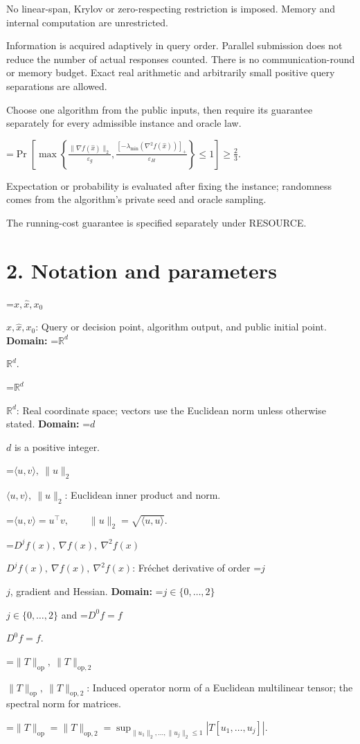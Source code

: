 \documentclass[10pt,a4paper]{article}
\newcommand{\AtlasMath}[1]{\par\begingroup\centering\setbox0=\hbox{$\displaystyle #1$}\ifdim\wd0>1.4\linewidth\typeout{ATLAS WIDE FORMULA: \the\wd0}\fi\ifdim\wd0>\linewidth\resizebox{\linewidth}{!}{\box0}\else\box0\fi\par\endgroup}
\newcommand{\AtlasInlineMath}[1]{\begingroup\setbox0=\hbox{$#1$}\ifdim\wd0>.4\linewidth\endgroup\AtlasMath{#1}\else\endgroup$#1$\fi}
\begin{document}
No linear-span, Krylov or zero-respecting restriction is imposed. Memory and internal computation are unrestricted.

Information is acquired adaptively in query order. Parallel submission does not reduce the number of actual responses counted. There is no communication-round or memory budget. Exact real arithmetic and arbitrarily small positive query separations are allowed.

Choose one algorithm from the public inputs, then require its guarantee separately for every admissible instance and oracle law.


\AtlasMath{\Pr\!\left[\max\left\{\frac{\|\nabla f(\widehat{x})\|_2}{\varepsilon_g},\frac{[-\lambda_{\min}(\nabla^2f(\widehat{x}))]_+}{\varepsilon_H}\right\}\le 1\right]\ge\frac23.}


Expectation or probability is evaluated after fixing the instance; randomness comes from the algorithm's private seed and oracle sampling.

The running-cost guarantee is specified separately under RESOURCE.

\section{2. Notation and parameters}
\AtlasInlineMath{x,\widehat{x},x_0}: Query or decision point, algorithm output, and public initial point. \textbf{Domain:} \AtlasInlineMath{\mathbb{R}^d}.

\AtlasInlineMath{\mathbb{R}^d}: Real coordinate space; vectors use the Euclidean norm unless otherwise stated. \textbf{Domain:} \AtlasInlineMath{d} is a positive integer.

\AtlasInlineMath{\langle u,v\rangle,\ \|u\|_2}: Euclidean inner product and norm.


\AtlasMath{\langle u,v\rangle=u^\top v,\qquad\|u\|_2=\sqrt{\langle u,u\rangle}.}


\AtlasInlineMath{D^jf(x),\ \nabla f(x),\ \nabla^2f(x)}: Fréchet derivative of order \AtlasInlineMath{j}, gradient and Hessian. \textbf{Domain:} \AtlasInlineMath{j\in\{0,\ldots,2\}} and \AtlasInlineMath{D^0f=f}.

\AtlasInlineMath{\|T\|_{\mathrm{op}},\ \|T\|_{\mathrm{op},2}}: Induced operator norm of a Euclidean multilinear tensor; the spectral norm for matrices.


\AtlasMath{\|T\|_{\mathrm{op}}=\|T\|_{\mathrm{op},2}=\sup_{\|u_1\|_2,\ldots,\|u_j\|_2\le1}|T[u_1,\ldots,u_j]|.}
\end{document}
